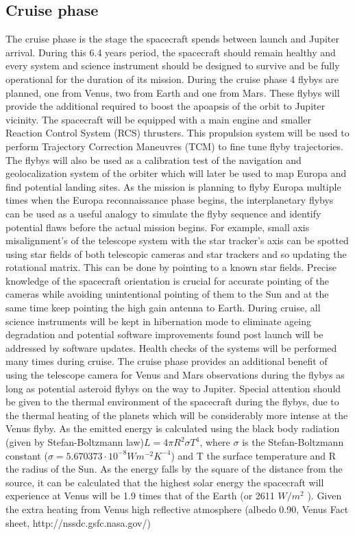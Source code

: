 \subsection{Cruise phase}
The cruise phase is the stage the spacecraft spends between launch and Jupiter arrival. During this 6.4 years period, the spacecraft should remain healthy and every system and science instrument should be designed to survive and be fully operational for the duration of its mission. During the cruise phase 4 flybys are planned, one from Venus, two from Earth and one from Mars. These flybys will provide the additional required to boost the apoapsis of the orbit to Jupiter vicinity. The spacecraft will be equipped with a main engine and smaller Reaction Control System (RCS) thrusters. This propulsion system will be used to perform Trajectory Correction Maneuvres (TCM) to fine tune flyby trajectories. The flybys will also be used as a calibration test of the navigation and geolocalization system of the orbiter which will later be used to map Europa and find potential landing sites. As the mission is planning to flyby Europa multiple times when the Europa reconnaissance phase begins, the interplanetary flybys can be used as a useful analogy to simulate the flyby sequence and identify potential flaws before the actual mission begins. For example, small axis misalignment's of the telescope system with the star tracker’s axis can be spotted using star fields of both telescopic cameras and star trackers and so updating the rotational matrix. This can be done by pointing to a known star fields. Precise knowledge of the spacecraft orientation is crucial for accurate pointing of the cameras while avoiding unintentional pointing of them to the Sun and at the same time keep pointing the high gain antenna to Earth. During cruise, all science instruments will be kept in hibernation mode to eliminate ageing degradation and potential software improvements found post launch will be addressed by software updates. Health checks of the systems will be performed many times during cruise. The cruise phase provides an additional benefit of using the telescope camera for Venus and Mars observations during the flybys as long as potential asteroid flybys on the way to Jupiter. Special attention should be given to the thermal environment of the spacecraft during the flybys, due to the thermal heating of the planets which will be considerably more intense at the Venus flyby. As the emitted energy is calculated using the black body radiation (given by Stefan-Boltzmann law)$L=4\pi R^2\sigma T^4$, where $\sigma$ is the Stefan-Boltzmann constant ($\sigma=5.670373\cdot 10^{-8}  Wm^{-2} K^{-4}$) and T the surface temperature and R the radius of the Sun. As the energy falls by the square of the distance from the source, it can be calculated that the highest solar energy the spacecraft will experience at Venus will be 1.9 times that of the Earth (or 2611 $W/m^2$ ). Given the extra heating from Venus high reflective atmosphere (albedo 0.90, Venus Fact sheet, http://nssdc.gsfc.nasa.gov/) 
